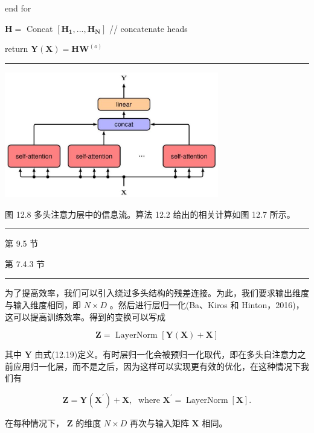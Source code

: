 \documentclass[10pt]{article}
\newcommand{\HRule}{\begin{center}\rule{0.9\linewidth}{0.2mm}\end{center}}
\begin{document}
end for

\(\mathbf{H} =\) Concat \(\left\lbrack  {\mathbf{{H}_{1}},...,\mathbf{{H}_{N}}}\right\rbrack\) // concatenate heads

return \(\mathbf{Y}\left( \mathbf{X}\right)  = \mathbf{H}{\mathbf{W}}^{\left( o\right) }\)

\HRule

\begin{center}
\includegraphics[max width=0.7\textwidth]{images/0194e279-9b28-703a-88f4-c3ac21e2010d_388_580_353_909_534_0.jpg}
\end{center}
\hspace*{3em} 

图 12.8 多头注意力层中的信息流。算法 12.2 给出的相关计算如图 12.7 所示。

\HRule

第 9.5 节

第 7.4.3 节

\HRule

为了提高效率，我们可以引入绕过多头结构的残差连接。为此，我们要求输出维度与输入维度相同，即 \(N \times  D\) 。然后进行层归一化(Ba、Kiros 和 Hinton，2016)，这可以提高训练效率。得到的变换可以写成

\[
\mathbf{Z} = \text{ LayerNorm }\left\lbrack  {\mathbf{Y}\left( \mathbf{X}\right)  + \mathbf{X}}\right\rbrack   \tag{12.20}
\]

其中 \(\mathbf{Y}\) 由式(12.19)定义。有时层归一化会被预归一化取代，即在多头自注意力之前应用归一化层，而不是之后，因为这样可以实现更有效的优化，在这种情况下我们有

\[
\mathbf{Z} = \mathbf{Y}\left( {\mathbf{X}}^{\prime }\right)  + \mathbf{X},\;\text{ where }{\mathbf{X}}^{\prime } = \operatorname{LayerNorm}\left\lbrack  \mathbf{X}\right\rbrack  . \tag{12.21}
\]

在每种情况下， \(\mathbf{Z}\) 的维度 \(N \times  D\) 再次与输入矩阵 \(\mathbf{X}\) 相同。
\end{document}
